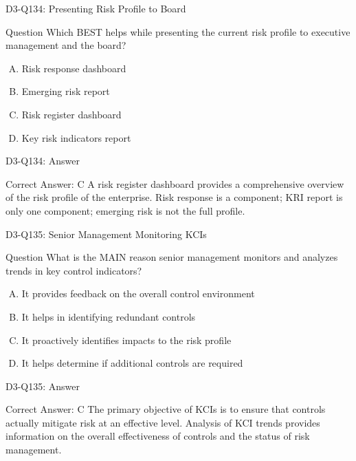 \documentclass{beamer}
\begin{document}
	\begin{frame}{D3-Q134: Presenting Risk Profile to Board}
		\begin{block}{Question}
			Which BEST helps while presenting the current risk profile to executive management and the board?
		\end{block}
		\begin{enumerate}[(A)]
			\item Risk response dashboard
			\item Emerging risk report
			\item Risk register dashboard
			\item Key risk indicators report
		\end{enumerate}
	\end{frame}
	\begin{frame}{D3-Q134: Answer}
		\begin{block}{Correct Answer: C}
			A risk register dashboard provides a comprehensive overview of the risk profile of the enterprise. Risk response is a component; KRI report is only one component; emerging risk is not the full profile.
		\end{block}
	\end{frame}
	
	\begin{frame}{D3-Q135: Senior Management Monitoring KCIs}
		\begin{block}{Question}
			What is the MAIN reason senior management monitors and analyzes trends in key control indicators?
		\end{block}
		\begin{enumerate}[(A)]
			\item It provides feedback on the overall control environment
			\item It helps in identifying redundant controls
			\item It proactively identifies impacts to the risk profile
			\item It helps determine if additional controls are required
		\end{enumerate}
	\end{frame}
	\begin{frame}{D3-Q135: Answer}
		\begin{block}{Correct Answer: C}
			The primary objective of KCIs is to ensure that controls actually mitigate risk at an effective level. Analysis of KCI trends provides information on the overall effectiveness of controls and the status of risk management.
		\end{block}
	\end{frame}
	
\end{document}
